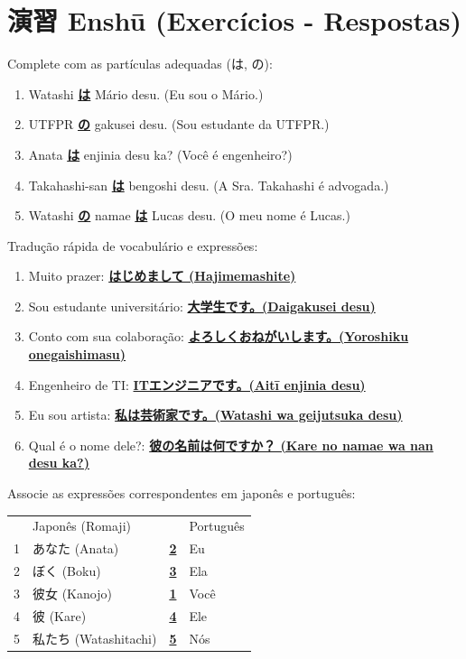 \documentclass[12pt,a4paper]{article}
\newcommand{\lacunaR}[1]{\underline{\hspace{0.5cm}\textbf{#1}\hspace{0.5cm}}}
\newcommand{\resposta}[1]{\textbf{\underline{#1}}}
\begin{document}
\vspace{0.5cm}

\newpage

\section*{演習 Enshū (Exercícios - Respostas)}

Complete com as partículas adequadas (は, の):

\begin{enumerate}[label=\alph*, leftmargin=*]
    \item Watashi \resposta{は} Mário desu. (Eu sou o Mário.)
    \item UTFPR \resposta{の} gakusei desu. (Sou estudante da UTFPR.)
    \item Anata \resposta{は} enjinia desu ka? (Você é engenheiro?)
    \item Takahashi-san \resposta{は} bengoshi desu. (A Sra. Takahashi é advogada.)
    \item Watashi \resposta{の} namae \resposta{は} Lucas desu. (O meu nome é Lucas.)
\end{enumerate}

\vspace{0.5cm}

Tradução rápida de vocabulário e expressões:

\begin{enumerate}[label=\alph*, leftmargin=*]
    \item Muito prazer: \resposta{はじめまして (Hajimemashite)}
    \item Sou estudante universitário: \resposta{大学生です。(Daigakusei desu)}
    \item Conto com sua colaboração: \resposta{よろしくおねがいします。(Yoroshiku onegaishimasu)}
    \item Engenheiro de TI: \resposta{ITエンジニアです。(Aitī enjinia desu)}
    \item Eu sou artista: \resposta{私は芸術家です。(Watashi wa geijutsuka desu)}
    \item Qual é o nome dele?: \resposta{彼の名前は何ですか？ (Kare no namae wa nan desu ka?)}
\end{enumerate}

\vspace{0.5cm}

Associe as expressões correspondentes em japonês e português:

\vspace{0.3cm}
\begin{tabular}{c l c l}
 & Japonês (Romaji) & & Português \\ 
1 & あなた (Anata) & \lacunaR{2} & Eu \\
2 & ぼく (Boku) & \lacunaR{3} & Ela \\
3 & 彼女 (Kanojo) & \lacunaR{1} & Você \\
4 & 彼 (Kare) & \lacunaR{4} & Ele \\
5 & 私たち (Watashitachi) & \lacunaR{5} & Nós \\ 
\end{tabular}
\end{document}
